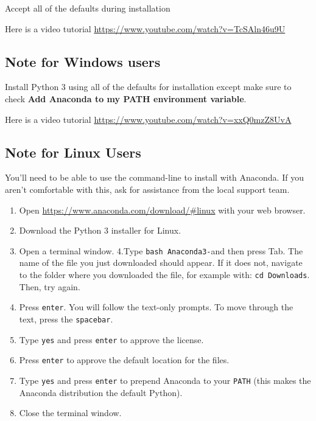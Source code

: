 \documentclass[]{book}
\providecommand{\tightlist}{%
  \setlength{\itemsep}{0pt}\setlength{\parskip}{0pt}}
\theoremstyle{definition}
\theoremstyle{definition}
\theoremstyle{definition}
\theoremstyle{remark}
\begin{document}
Accept all of the defaults during installation

Here is a video tutorial
\url{https://www.youtube.com/watch?v=TcSAln46u9U}

\hypertarget{note-for-windows-users}{%
\subsection{Note for Windows users}\label{note-for-windows-users}}

Install Python 3 using all of the defaults for installation except make
sure to check \textbf{Add Anaconda to my PATH environment variable}.

Here is a video tutorial
\url{https://www.youtube.com/watch?v=xxQ0mzZ8UvA}

\hypertarget{note-for-linux-users}{%
\subsection{Note for Linux Users}\label{note-for-linux-users}}

You'll need to be able to use the command-line to install with Anaconda.
If you aren't comfortable with this, ask for assistance from the local
support team.

\begin{enumerate}
\def\labelenumi{\arabic{enumi}.}
\tightlist
\item
  Open \href{}{https://www.anaconda.com/download/\#linux} with your web
  browser.
\item
  Download the Python 3 installer for Linux.
\item
  Open a terminal window. 4.Type \texttt{bash\ Anaconda3-}and then press
  Tab. The name of the file you just downloaded should appear. If it
  does not, navigate to the folder where you downloaded the file, for
  example with: \texttt{cd\ Downloads}. Then, try again.
\item
  Press \texttt{enter}. You will follow the text-only prompts. To move
  through the text, press the \texttt{spacebar}.
\item
  Type \texttt{yes} and press \texttt{enter} to approve the license.
\item
  Press \texttt{enter} to approve the default location for the files.
\item
  Type \texttt{yes} and press \texttt{enter} to prepend Anaconda to your
  \texttt{PATH} (this makes the Anaconda distribution the default
  Python).
\item
  Close the terminal window.
\end{enumerate}
\end{document}
